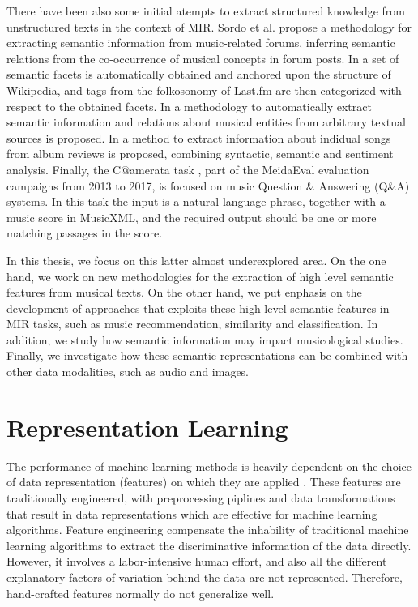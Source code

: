 There have been also some initial atempts to extract structured knowledge from unstructured texts in the context of MIR. Sordo et al. \cite{Sordo2012} propose a methodology for extracting semantic information from music-related forums, inferring semantic relations from the co-occurrence of musical concepts in forum posts. In \cite{Sordo2013} a set of semantic facets is automatically obtained and anchored upon the structure of Wikipedia, and tags from the folkosonomy of Last.fm are then categorized with respect to the obtained facets. In \cite{Knees2011} a methodology to automatically extract semantic information and relations about musical entities from arbitrary textual sources is proposed. In \cite{TataandDiEugenio2010} a method to extract information about indidual songs from album reviews is proposed, combining syntactic, semantic and sentiment analysis. Finally, the C@amerata task \cite{sutcliffe2016c, sutcliffe2015}, part of the MeidaEval evaluation campaigns from 2013 to 2017, is focused on music Question & Answering (Q&A) systems. In this task the input is a natural language phrase, together with a music score in MusicXML, and the required output should be one or more matching passages in the score.

In this thesis, we focus on this latter almost underexplored area. On the one hand, we work on new methodologies for the extraction of high level semantic features from musical texts. On the other hand, we put enphasis on the development of approaches that exploits these high level semantic features in MIR tasks, such as music recommendation, similarity and classification. In addition, we study how semantic information may impact musicological studies. Finally, we investigate how these semantic representations can be combined with other data modalities, such as audio and images.

\section{Representation Learning}

The performance of machine learning methods is heavily dependent on the choice of data representation (features) on which they are applied \cite{Bengio}. These features are traditionally engineered, with preprocessing piplines and data transformations that result in data representations which are effective for machine learning algorithms. Feature engineering compensate the inhability of traditional machine learning algorithms to extract the discriminative information of the data directly. However, it involves a labor-intensive human effort, and also all the different explanatory factors of variation behind the data are not represented. Therefore, hand-crafted features normally do not generalize well. 

